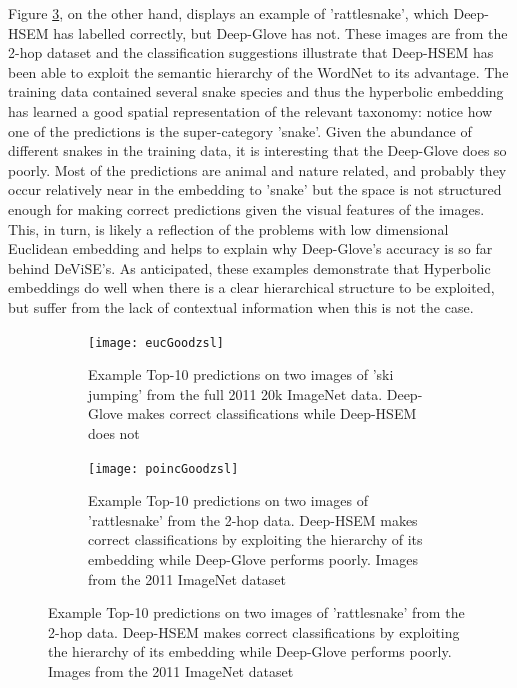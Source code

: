 \documentclass[12pt]{report}
\begin{document}
Figure \ref{fig:poincgoodzsl}, on the other hand, displays an example of 'rattlesnake', which Deep-HSEM has labelled correctly, but Deep-Glove has not. These images are from the 2-hop dataset and the classification suggestions illustrate that Deep-HSEM has been able to exploit the semantic hierarchy of the WordNet to its advantage. The training data contained several snake species and thus the hyperbolic embedding has learned a good spatial representation of the relevant taxonomy: notice how one of the predictions is the super-category 'snake'. Given the abundance of different snakes in the training data, it is interesting that the Deep-Glove does so poorly. Most of the predictions are animal and nature related, and probably they occur relatively near in the embedding to 'snake' but the space is not structured enough for making correct predictions given the visual features of the images. This, in turn, is likely a reflection of the problems with low dimensional Euclidean embedding and helps to explain why Deep-Glove's accuracy is so far behind DeViSE's. As anticipated, these examples demonstrate that Hyperbolic embeddings do well when there is a clear hierarchical structure to be exploited, but suffer from the lack of contextual information when this is not the case.

\begin{figure}
  \centering
  \begin{subfigure}[b]{0.9\textwidth}
  \texttt{[image: eucGoodzsl]}
  \caption{Example Top-10 predictions on two images of 'ski jumping' from the full 2011 20k ImageNet data. Deep-Glove makes correct classifications while Deep-HSEM does not}
  \label{fig:eucgoodzsl}
\end{subfigure}

\begin{subfigure}[b]{0.9\textwidth}
  \texttt{[image: poincGoodzsl]}
  \caption{Example Top-10 predictions on two images of 'rattlesnake' from the 2-hop data. Deep-HSEM makes correct classifications by exploiting the hierarchy of its embedding while Deep-Glove performs poorly. Images from the 2011 ImageNet dataset \cite{JiaDeng2009}}
  \label{fig:poincgoodzsl}
\end{subfigure}
\end{figure}
\end{document}
